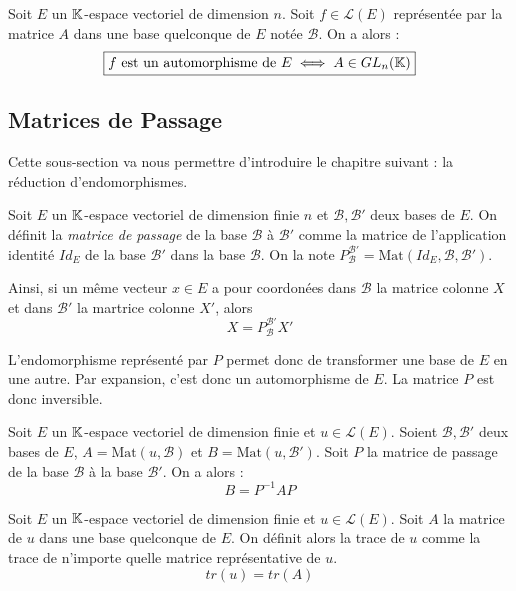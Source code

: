 \begin{theorem}[Inversion]
    Soit $E$ un $\mathbb{K}$-espace vectoriel de dimension $n$. Soit $f \in \mathcal{L}(E)$ représentée 
    par la matrice $A$ dans une base quelconque de $E$ notée $ \mathcal{B}$. On a alors : 
        \[ \boxed{f \text{ est un automorphisme de } E \iff A \in GL_n(\mathbb{K})} \] 
\end{theorem}

\subsection{Matrices de Passage}

Cette sous-section va nous permettre d'introduire le chapitre suivant : la réduction d'endomorphismes. 

\begin{definition}
    Soit $E$ un $\mathbb{K}$-espace vectoriel de dimension finie $n$ et $ \mathcal{B}, \mathcal{B}'$ deux bases de $E$. 
    On définit la \emph{matrice de passage} de la base $ \mathcal{B}$ à $ \mathcal{B}'$ comme la matrice de 
    l'application identité $Id_E$ de la base $ \mathcal{B}'$ dans la base $ \mathcal{B}$. 
    On la note $ P_{ \mathcal{B}}^{ \mathcal{B}'} = \text{Mat}(Id_E, \mathcal{B}, \mathcal{B}')$. 

    Ainsi, si un même vecteur $x \in E$ a pour coordonées dans $ \mathcal{B}$ la matrice colonne $X$ et 
    dans $ \mathcal{B}'$ la martrice colonne $X'$, alors 
        \[ X =  P_{ \mathcal{B}}^{ \mathcal{B}'} X' \] 
\end{definition}

\begin{remark}
    L'endomorphisme représenté par $P$ permet donc de transformer une base de $E$ en une autre. 
    Par expansion, c'est donc un automorphisme de $E$. La matrice $P$ est donc inversible. 
\end{remark}

\begin{corollary}
    Soit $E$ un $\mathbb{K}$-espace vectoriel de dimension finie et $u \in \mathcal{L}(E)$. 
    Soient $ \mathcal{B}, \mathcal{B}'$ deux bases de $E$, $A = \text{Mat}(u, \mathcal{B})$ et 
    $ B = \text{Mat}(u, \mathcal{B}')$. Soit $P$ la matrice de passage de la base 
    $ \mathcal{B}$ à la base $ \mathcal{B}'$. On a alors : 
        \[ B = P^{-1}AP \] 
\end{corollary}

\begin{definition}
    Soit $E$ un $\mathbb{K}$-espace vectoriel de dimension finie et $u \in \mathcal{L}(E)$. 
    Soit $A$ la matrice de $u$ dans une base quelconque de $E$. On définit 
    alors la trace de $u$ comme la trace de n'importe quelle matrice représentative de $u$. 
        \[ tr(u) = tr(A) \] 
\end{definition}

